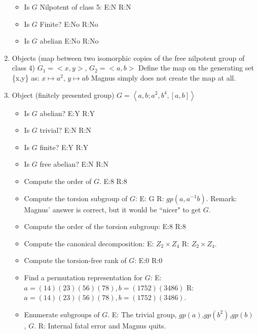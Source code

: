\documentclass{article}
\begin{document}
\begin{enumerate}
\begin{itemize}
\item Is $G$ Nilpotent of class 5: E:N R:N

\item Is $G$ Finite? E:No R:No

\item Is $G$ abelian E:No R:No
\end{itemize}
\item Objects (map between two isomorphic copies of the free nilpotent group
of class 4)
$G_1=<x,y>$, $G_2=<a,b>$
Define the map on the generating set \{x,y\} as:
$x \mapsto a^2$, $y \mapsto ab$
Magnus simply does not create the map at all.
\item Object (finitely presented group)
$G=\left<a,b; a^2, b^4, [a,b] \right>$
\begin{itemize}
\item Is $G$ abelian? E:Y R:Y
\item Is $G$ trivial? E:N R:N
\item Is $G$ finite? E:Y R:Y
\item Is $G$ free abelian? E:N R:N
\item Compute the order of $G$. E:8 R:8
\item Compute the torsion subgroup of $G$:
E: G R: $gp(a,a^{-1}b)$.
Remark: Magnus' answer is correct, but it would be ``nicer" to get $G$.
\item Compute the order of the torsion subgroup: E:8 R:8
\item Compute the canonical decomposition:
E: $Z_2 \times Z_4$ R: $Z_2 \times Z_4.$
\item Compute the torsion-free rank of $G$:
E:0 R:0
\item Find a permutation representation for $G$:
E: $a=(1 4 )(2 3 )(5 6 )(7 8 ), b=(1 7 5 2 )(3 4 8 6 )$
R: $a=(1 4 )(2 3 )(5 6 )(7 8 ), b=(1 7 5 2 )(3 4 8 6 )$.
\item Enumerate subgroups of $G$.
E: The trivial group, $gp(a)$,$gp(b^2)$,$gp(b)$, $G$.
R: Internal fatal error and Magnus quits.
\end{itemize}
\end{enumerate}
\end{document}
